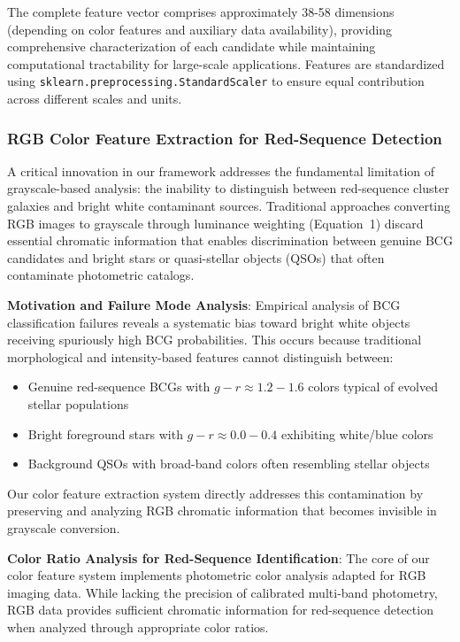 \documentclass[twocolumn,10pt]{aastex631}
\begin{document}
The complete feature vector comprises approximately 38-58 dimensions (depending on color features and auxiliary data availability), providing comprehensive characterization of each candidate while maintaining computational tractability for large-scale applications. Features are standardized using \texttt{sklearn.preprocessing.StandardScaler} to ensure equal contribution across different scales and units.

\subsubsection{RGB Color Feature Extraction for Red-Sequence Detection}

A critical innovation in our framework addresses the fundamental limitation of grayscale-based analysis: the inability to distinguish between red-sequence cluster galaxies and bright white contaminant sources. Traditional approaches converting RGB images to grayscale through luminance weighting (Equation~1) discard essential chromatic information that enables discrimination between genuine BCG candidates and bright stars or quasi-stellar objects (QSOs) that often contaminate photometric catalogs.

\textbf{Motivation and Failure Mode Analysis}: Empirical analysis of BCG classification failures reveals a systematic bias toward bright white objects receiving spuriously high BCG probabilities. This occurs because traditional morphological and intensity-based features cannot distinguish between:
\begin{itemize}
\item Genuine red-sequence BCGs with $g-r \approx 1.2-1.6$ colors typical of evolved stellar populations \citep{Bell2004,Bruzual2003}
\item Bright foreground stars with $g-r \approx 0.0-0.4$ exhibiting white/blue colors
\item Background QSOs with broad-band colors often resembling stellar objects
\end{itemize}

Our color feature extraction system directly addresses this contamination by preserving and analyzing RGB chromatic information that becomes invisible in grayscale conversion.

\textbf{Color Ratio Analysis for Red-Sequence Identification}: The core of our color feature system implements photometric color analysis adapted for RGB imaging data. While lacking the precision of calibrated multi-band photometry, RGB data provides sufficient chromatic information for red-sequence detection when analyzed through appropriate color ratios.
\end{document}
